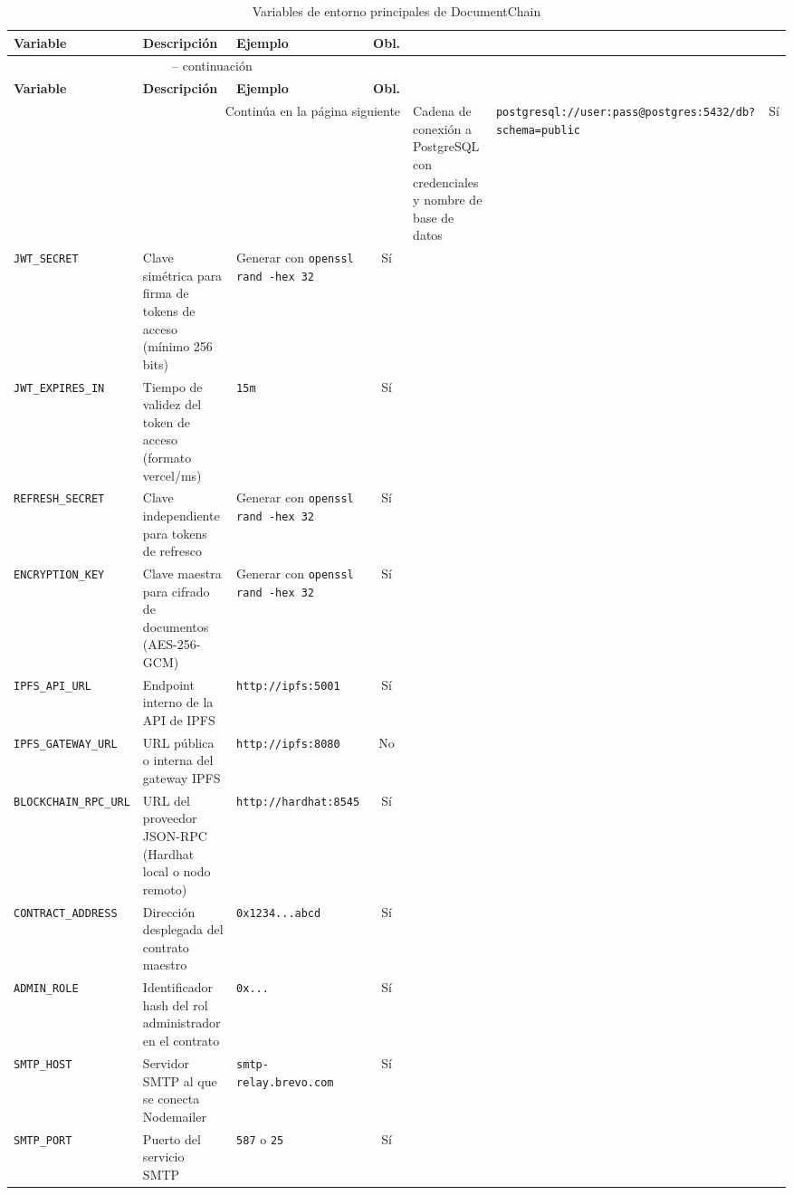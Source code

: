 \documentclass[11pt, a4paper]{article}
\begin{document}
\begin{longtable}{@{}lp{4.5cm}p{3cm}c@{}}
\caption{Variables de entorno principales de DocumentChain} \\
\toprule
\textbf{Variable} & \textbf{Descripci\'{o}n} & \textbf{Ejemplo} & \textbf{Obl.} \\
\midrule
\endfirsthead
\multicolumn{4}{c}{\tablename\ \thetable{} -- continuaci\'{o}n} \\
\toprule
\textbf{Variable} & \textbf{Descripci\'{o}n} & \textbf{Ejemplo} & \textbf{Obl.} \\
\midrule
\endhead
\midrule
\multicolumn{4}{r}{Contin\'{u}a en la p\'{a}gina siguiente}
\endfoot
\bottomrule
\endlastfoot
\texttt{DATABASE\_URL} & Cadena de conexi\'{o}n a PostgreSQL con credenciales y nombre de base de datos & \texttt{postgresql://user:pass@postgres:5432/db?schema=public} & S\'{i} \\
\texttt{JWT\_SECRET} & Clave sim\'{e}trica para firma de tokens de acceso (m\'{i}nimo 256 bits) & Generar con \texttt{openssl rand -hex 32} & S\'{i} \\
\texttt{JWT\_EXPIRES\_IN} & Tiempo de validez del token de acceso (formato vercel/ms) & \texttt{15m} & S\'{i} \\
\texttt{REFRESH\_SECRET} & Clave independiente para tokens de refresco & Generar con \texttt{openssl rand -hex 32} & S\'{i} \\
\texttt{ENCRYPTION\_KEY} & Clave maestra para cifrado de documentos (AES-256-GCM) & Generar con \texttt{openssl rand -hex 32} & S\'{i} \\
\texttt{IPFS\_API\_URL} & Endpoint interno de la API de IPFS & \texttt{http://ipfs:5001} & S\'{i} \\
\texttt{IPFS\_GATEWAY\_URL} & URL p\'{u}blica o interna del gateway IPFS & \texttt{http://ipfs:8080} & No \\
\texttt{BLOCKCHAIN\_RPC\_URL} & URL del proveedor JSON-RPC (Hardhat local o nodo remoto) & \texttt{http://hardhat:8545} & S\'{i} \\
\texttt{CONTRACT\_ADDRESS} & Direcci\'{o}n desplegada del contrato maestro & \texttt{0x1234...abcd} & S\'{i} \\
\texttt{ADMIN\_ROLE} & Identificador hash del rol administrador en el contrato & \texttt{0x...} & S\'{i} \\
\texttt{SMTP\_HOST} & Servidor SMTP al que se conecta Nodemailer & \texttt{smtp-relay.brevo.com} & S\'{i} \\
\texttt{SMTP\_PORT} & Puerto del servicio SMTP & \texttt{587} o \texttt{25} & S\'{i} \\

\end{longtable}
\end{document}
